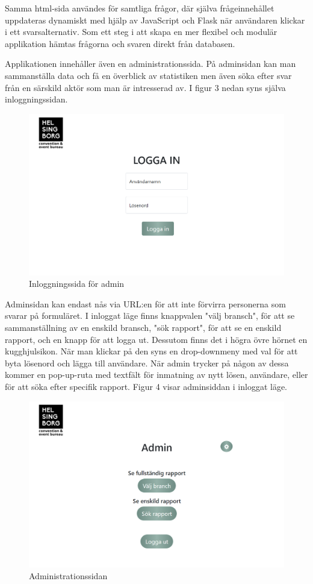 \documentclass[12pt]{article}
\begin{document}
Samma html-sida användes för samtliga frågor, där själva frågeinnehållet uppdateras dynamiskt med hjälp av JavaScript och Flask när användaren klickar i ett svarsalternativ. Som ett steg i att skapa en mer flexibel och modulär applikation hämtas frågorna och svaren direkt från databasen.

Applikationen innehåller även en administrationssida.
 På adminsidan kan man sammanställa data och få en överblick av statistiken men även söka efter svar från en särskild aktör som man är intresserad av. I figur 3 nedan syns själva inloggningssidan.
 
 \begin{figure}[H]
    \centering
    \includegraphics[width=12cm]{images/admin_log_in.png}
    \caption{Inloggningssida för admin}
    \label{fig:admin_login}
\end{figure}

Adminsidan kan endast nås via URL:en för att inte förvirra personerna som svarar på formuläret. I inloggat läge finns knappvalen "välj bransch", för att se sammanställning av en enskild bransch, "sök rapport", för att se en enskild rapport, och en knapp för att logga ut. Dessutom finns det i högra övre hörnet en kugghjulsikon. När man klickar på den syns en drop-downmeny med val för att byta lösenord och lägga till användare. När admin trycker på någon av dessa kommer en pop-up-ruta med textfält för inmatning av nytt lösen, användare, eller för att söka efter specifik rapport. Figur 4 visar adminsiddan i inloggat läge.

\begin{figure}[H]
    \centering
    \includegraphics[width=12cm]{images/admin_index.png}
    \caption{Administrationssidan}
    \label{fig:question}
\end{figure}
\end{document}
